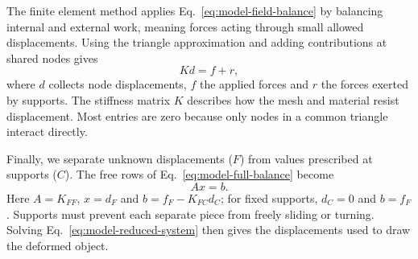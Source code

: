 The finite element method applies Eq.~\eqref{eq:model-field-balance}
by balancing internal and external work, meaning forces acting through
small allowed displacements. Using the triangle approximation and adding
contributions at shared nodes gives
\begin{equation}
 Kd=f+r,
 \label{eq:model-full-balance}
\end{equation}
where $d$ collects node displacements, $f$ the applied forces and $r$ the
forces exerted by supports. The stiffness matrix $K$ describes how the
mesh and material resist displacement. Most entries are zero because
only nodes in a common triangle interact directly.

Finally, we separate unknown displacements ($F$) from values prescribed
at supports ($C$). The free rows of Eq.~\eqref{eq:model-full-balance} become
\begin{equation}
 Ax=b.
 \label{eq:model-reduced-system}
\end{equation}
Here $A=K_{FF}$, $x=d_F$ and $b=f_F-K_{FC}d_C$; for fixed supports,
$d_C=0$ and $b=f_F$. Supports must prevent each separate piece from
freely sliding or turning. Solving Eq.~\eqref{eq:model-reduced-system}
then gives the displacements used to draw the deformed object.
